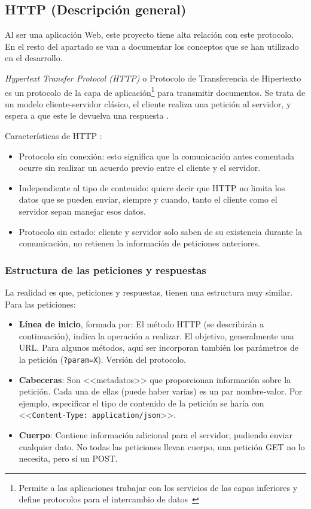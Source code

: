 \subsection{HTTP (Descripción general)}

Al ser una aplicación Web, este proyecto tiene alta relación con este protocolo.
En el resto del apartado se van a documentar los conceptos que se han utilizado
en el desarrollo.

\emph{Hypertext Transfer Protocol (HTTP)} o Protocolo de Transferencia de
Hipertexto es un protocolo de la capa de aplicación\footnote{Permite a las
aplicaciones trabajar con los servicios de las capas inferiores y define
protocolos para el intercambio de datos~\cite{eswiki:149372346}} para transmitir
documentos. Se trata de un modelo cliente-servidor clásico, el cliente realiza
una petición al servidor, y espera a que este le devuelva una respuesta
\cite{http:mdn}.



Características de HTTP \cite{http:features}:
\begin{itemize}
	\item Protocolo sin conexión: esto significa que la comunicación antes
	comentada ocurre sin realizar un acuerdo previo entre el cliente y el
	servidor.
	\item Independiente al tipo de contenido: quiere decir que HTTP no limita
	los datos que se pueden enviar, siempre y cuando, tanto el cliente como el
	servidor sepan manejar esos datos.
	\item Protocolo sin estado: cliente y servidor solo saben de su existencia
	durante la comunicación, no retienen la información de peticiones
	anteriores.
\end{itemize}


\subsubsection{Estructura de las peticiones y respuestas}

La realidad es que, peticiones y respuestas, tienen una estructura muy similar. Para las peticiones:
\begin{itemize}
	\item \textbf{Línea de inicio}, formada por:
  \subitem El método HTTP (se describirán a continuación), indica la operación a realizar.
  \subitem El objetivo, generalmente una URL. Para algunos métodos, aquí ser
  incorporan también los parámetros de la petición (\texttt{?param=X}).
  \subitem Versión del protocolo.
	\item \textbf{Cabeceras}: Son <<metadatos>> que proporcionan información sobre la
  petición. Cada una de ellas (puede haber varias) es un par nombre-valor.	Por
  ejemplo, especificar el tipo de contenido de la petición se haría con
  <<\texttt{Content-Type: application/json}>>.
  \item \textbf{Cuerpo}: Contiene información adicional para el servidor, pudiendo enviar
  cualquier dato. No todas las peticiones llevan cuerpo, una petición GET no lo
  necesita, pero sí un POST.
\end{itemize}

